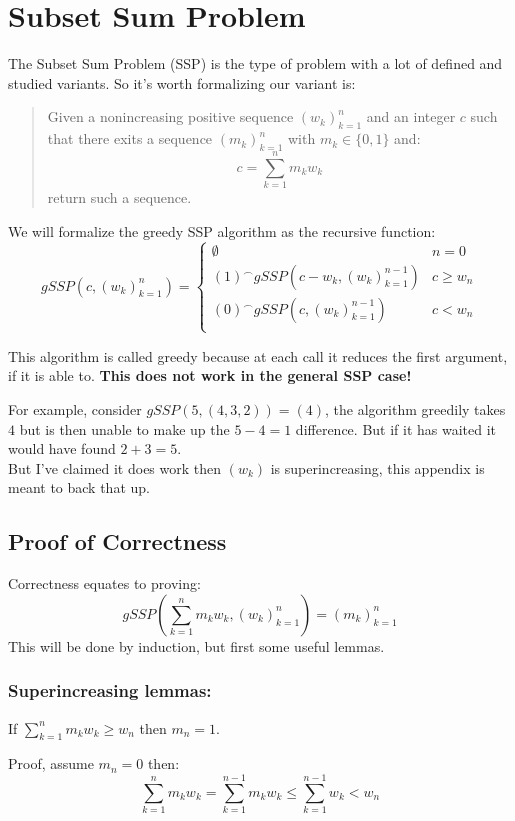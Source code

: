 
\section{Subset Sum Problem}
\label{appx:SSP}
The Subset Sum Problem (SSP) is the type of problem with a lot of defined and studied variants.
So it's worth formalizing our variant is:
\begin{quote}
	Given a nonincreasing positive sequence $(w_k)_{k=1}^n$ and an integer $c$ such that there exits a sequence $(m_k)_{k=1}^n$ with $m_k \in \{0,1\}$ and:
\[c = \sum_{k=1}^nm_kw_k\]
return such a sequence.
\end{quote}

We will formalize the greedy SSP algorithm as the recursive function:
\[gSSP(c,(w_k)_{k=1}^n) = \begin{cases}
	\emptyset & n = 0\\
	(1)^\frown gSSP(c-w_k,(w_k)_{k=1}^{n-1})& c \geq w_n \\
	(0)^\frown gSSP(c,(w_k)_{k=1}^{n-1})& c < w_n \\
\end{cases}\]

This algorithm is called greedy because at each call it reduces the first argument,
if it is able to.
{\bf This does not work in the general SSP case!}

For example, consider $gSSP(5,(4,3,2)) = (4)$,
the algorithm greedily takes $4$ but is then unable to make up the $5-4=1$ difference.
But if it has waited it would have found $2+3=5$.
\\

But I've claimed it does work then $(w_k)$ is superincreasing, 
this appendix is meant to back that up.

\subsection{Proof of Correctness}
Correctness equates to proving:
\[gSSP\left(\sum_{k=1}^nm_kw_k,(w_k)_{k=1}^n\right) =(m_k)_{k=1}^n\]
This will be done by induction, 
but first some useful lemmas.

\subsubsection{Superincreasing lemmas:}
If $\sum_{k=1}^nm_kw_k \geq w_n$ then $m_n = 1$.

Proof, assume $m_n = 0$ then:
\[\sum_{k=1}^nm_kw_k = \sum_{k=1}^{n-1}m_kw_k \leq \sum_{k=1}^{n-1}w_k < w_n\]

